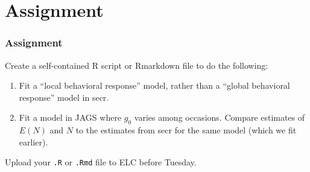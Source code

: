 \documentclass[color=usenames,dvipsnames]{beamer}\usepackage[]{graphicx}\usepackage[]{color}
\begin{document}
\section{Assignment}




\begin{frame}[fragile]
  \frametitle{Assignment}
  Create a self-contained R script or Rmarkdown file to do the
  following: 
  \vfill
  \begin{enumerate}
    \item Fit a ``local behavioral response'' model,
      rather than a ``global behavioral response'' model in secr.
    \item Fit a model in JAGS where $g_0$ varies among
      occasions. Compare estimates of $E(N)$ and $N$ to the estimates
      from secr for the same model (which we fit earlier).
  \end{enumerate}
  \vfill
  Upload your {\tt .R} or {\tt .Rmd} file to ELC before Tuesday. 
\end{frame}
\end{document}
